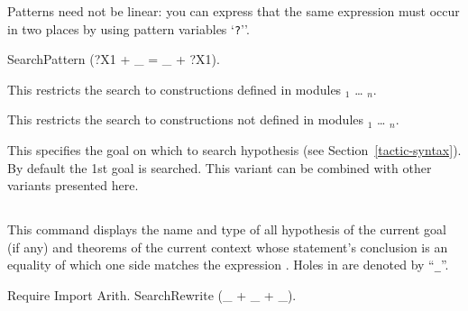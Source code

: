 Patterns need not be linear: you can express that the same expression
must occur in two places by using pattern variables `{\texttt
?{\ident}}''.

\begin{coq_example}
SearchPattern (?X1 + _ = _ + ?X1).
\end{coq_example}

\begin{Variants}
\item {}

This restricts the search to constructions defined in modules
{\module$_1$} \ldots{} {\module$_n$}.

\item {}

This restricts the search to constructions not defined in modules
{\module$_1$} \ldots{} {\module$_n$}.

\item {} %

  This specifies the goal on which to search hypothesis (see
  Section~\ref{tactic-syntax}). By default the 1st goal is searched.
  This variant can be combined with other variants presented here.

\end{Variants}

\subsection[\tt SearchRewrite {\term}.]{}

This command displays the name and type of all hypothesis of the
current goal (if any) and theorems of the current context whose
statement's conclusion is an equality of which one side matches the
expression {\term}. Holes in {\term} are denoted by ``{\texttt \_}''.

\begin{coq_example}
Require Import Arith.
SearchRewrite (_ + _ + _).
\end{coq_example}

